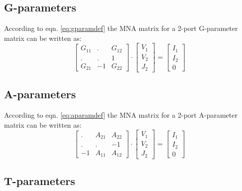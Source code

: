 \subsection{G-parameters}

According to eqn. \eqref{eq:gparamdef} the MNA matrix for a 2-port
G-parameter matrix can be written as:
\begin{equation}
\begin{bmatrix}
 G_{11} & .  &  G_{12} \\
 . & . & 1 \\
 G_{21} & -1 & G_{22}
\end{bmatrix}
\cdot
\begin{bmatrix}
V_{1}\\
V_{2}\\
J_{2}
\end{bmatrix}
=
\begin{bmatrix}
I_{1}\\
I_{2}\\
0
\end{bmatrix}
\end{equation}

\subsection{A-parameters}

According to eqn. \eqref{eq:aparamdef} the MNA matrix for a 2-port
A-parameter matrix can be written as:
\begin{equation}
\begin{bmatrix}
 . & A_{21}  &  A_{22} \\
 . & . & -1 \\
 -1 & A_{11} & A_{12}
\end{bmatrix}
\cdot
\begin{bmatrix}
V_{1}\\
V_{2}\\
J_{2}
\end{bmatrix}
=
\begin{bmatrix}
I_{1}\\
I_{2}\\
0
\end{bmatrix}
\end{equation}

\subsection{T-parameters}

